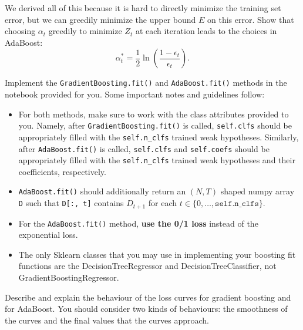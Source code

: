 \problem[2]
We derived all of this because it is hard to directly minimize the training set error, but we can greedily minimize the upper bound $E$ on this error. Show that choosing $\alpha_t$
greedily to minimize $Z_t$ at each iteration leads to the choices in
AdaBoost:
$$\alpha_{t}^* = \frac{1}{2} \ln \left(\frac{1 - \epsilon_t}{\epsilon_t} \right).$$

\begin{solution}
	
\end{solution}

\begin{problem}[14]
    Implement the \texttt{GradientBoosting.fit()} and \texttt{AdaBoost.fit()} methods in the notebook provided for you. Some important notes and guidelines follow:
    \begin{itemize}
        \item For both methods, make sure to work with the class attributes provided to you. Namely, after \texttt{GradientBoosting.fit()} is called, \texttt{self.clfs} should be appropriately filled with the \texttt{self.n_clfs} trained weak hypotheses. Similarly, after \texttt{AdaBoost.fit()} is called, \texttt{self.clfs} and \texttt{self.coefs} should be appropriately filled with the \texttt{self.n_clfs} trained weak hypotheses and their coefficients, respectively.
        \item \texttt{AdaBoost.fit()} should additionally return an $(N, T)$ shaped numpy array \texttt{D} such that \texttt{D[:, t]} contains $D_{t+1}$ for each $t \in \{0, \ldots, \texttt{self.n_clfs}\}$.
        \item For the \texttt{AdaBoost.fit()} method, \textbf{use the 0/1 loss} instead of the exponential loss.
	\item The only Sklearn classes that you may use in implementing your boosting fit functions are the DecisionTreeRegressor and DecisionTreeClassifier, not GradientBoostingRegressor.
    \end{itemize}
\end{problem}

\begin{problem}[2]
    Describe and explain the behaviour of the loss curves for gradient boosting and for AdaBoost. You should consider two kinds of behaviours: the smoothness of the curves and the final values that the curves approach.
\end{problem}

\begin{solution}
  
\end{solution}

